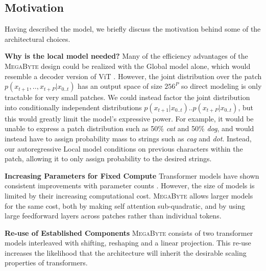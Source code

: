 \documentclass{article}
\newcommand{\fastslow}[0]{\textsc{MegaByte}\xspace}
\newcommand{\megabyte}[0]{\fastslow}
\theoremstyle{plain}
\theoremstyle{definition}
\theoremstyle{remark}
\begin{document}
\subsection{Motivation}
Having described the model, we briefly discuss the motivation behind some of the architectural choices.



\textbf{Why is the local model needed?} Many of the efficiency advantages of the \megabyte design could be realized with the Global model alone, which would resemble a decoder version of ViT \citep{vit}. However,  the joint distribution over the patch $p(x_{t+1},..,x_{t+P}|x_{0..t})$ has an output space of size $256^{P}$ so direct modeling is only tractable for very small patches. We could instead factor the joint distribution into conditionally independent distributions $p(x_{t+1}|x_{0..t})..p(x_{t+P}|x_{0..t})$, but this would greatly limit the model's expressive power. For example, it would be unable to express a patch distribution such as 50\% \emph{cat} and 50\% \emph{dog}, and would instead have to assign probability mass to strings such as \emph{cag} and \emph{dot}. Instead, our autoregressive Local model conditions on previous characters within the patch, allowing it to only assign probability to the desired strings.

\textbf{Increasing Parameters for Fixed Compute}  Transformer models have shown consistent improvements with parameter counts \citep{kaplan2020scaling}. However, the size of models is limited by their increasing computational cost. \megabyte allows larger models for the same cost, both by making self attention sub-quadratic, and by using large feedforward layers across patches rather than individual tokens.

\textbf{Re-use of Established Components} \megabyte consists of two transformer models interleaved with shifting, reshaping and a linear projection. This re-use increases the likelihood that the architecture will inherit the desirable scaling properties of transformers.

\end{document}

